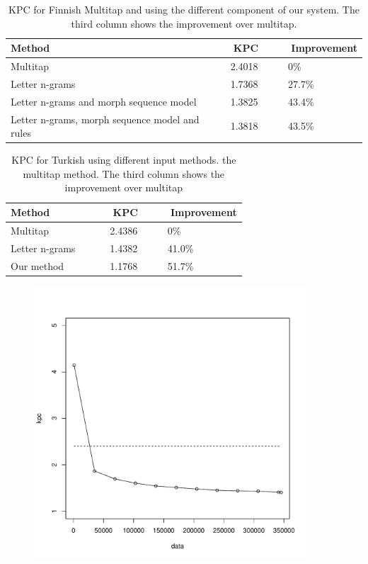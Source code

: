 \documentclass{llncs}
\begin{document}
\begin{table}
\begin{center}
\caption{KPC for Finnish Multitap and using the different component of
  our system. The third column shows the improvement over
  multitap.}\label{Finnish-kpc-table}
\begin{tabular}{lll}
\hline
Method &~~~~KPC &~~~~Improvement\\
\hline
Multitap                                       &~~~~2.4018 &~~~~0\%\\
Letter n-grams                                 &~~~~1.7368 &~~~~27.7\%\\
Letter n-grams and morph sequence model        &~~~~1.3825 &~~~~43.4\%\\
Letter n-grams, morph sequence model and rules &~~~~1.3818 &~~~~43.5\%\\
\hline
\end{tabular}
\end{center}
\end{table}

\begin{table}
\caption{KPC for Turkish using different input methods. the multitap method. The third column shows the improvement over
  multitap}\label{Turkish-kpc-table}
\begin{center}
\begin{tabular}{lll}
\hline
Method &~~~~KPC &~~~~Improvement\\
\hline
Multitap                          &~~~~2.4386 &~~~~0\%\\
Letter n-grams~\cite{Tantug:2010} &~~~~1.4382 &~~~~41.0\%\\
Our method                        &~~~~1.1768 &~~~~51.7\%\\
\hline
\end{tabular}
\end{center}
\end{table}




\begin{figure}[hbt!]
\includegraphics[width=4in]{finnish_kpc_figure.pdf}
\end{figure}
\end{document}
